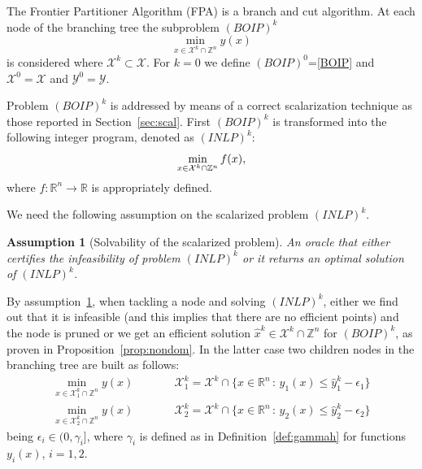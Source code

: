 \documentclass[preprint,12pt]{elsarticle}
\newtheorem{assumption}[theorem]{Assumption}
\def\X{{\cal X}}
\def\R{\mathbb{R}}
\def\Z{\mathbb{Z}}
\begin{document}
The Frontier Partitioner Algorithm (FPA) is a branch and cut algorithm. At each node of the branching tree the subproblem
$(BOIP)^k$
$$\min_{x\in \mathcal{X}^{k}\cap \Z^n} y(x)$$ is considered where $\mathcal{X}^{k}\subset \mathcal{X}$.
For $k=0$ we define $(BOIP)^0$=\eqref{BOIP} and $\mathcal{X}^0=\mathcal{X}$ and $\mathcal{Y}^0=\mathcal{Y}$.


Problem $(BOIP)^k$ is addressed by means of a correct scalarization technique as those reported in Section~\ref{sec:scal}. First
 $(BOIP)^k$ is transformed into the following integer program, denoted as $(INLP)^k$:
\begin{equation}
 \min_{x\in \mathcal{\X}^k\cap \Z^n} f(x),
\end{equation}
where $f:\R^n\rightarrow \R$ is appropriately defined.

We need the following assumption on
the scalarized problem $(INLP)^k$.
\begin{assumption}[Solvability of the scalarized problem]\label{ass:oracle}
An oracle that either certifies the infeasibility of problem  $(INLP)^k$ or it returns an optimal solution of $(INLP)^k$.
\end{assumption}

By assumption~\ref{ass:oracle}, when tackling a node and solving $(INLP)^k$, either we find out that it is infeasible
(and this implies that there are no efficient points) and the node is pruned
or we get an efficient solution $\hat x^k\in \mathcal{X}^k\cap \Z^n$ for $(BOIP)^k$, as proven in Proposition~\ref{prop:nondom}.
In the latter case two children nodes in the branching tree are built as follows:
%
\begin{equation*}\begin{array}{lcl}
 \displaystyle\min_{x\in \mathcal{X}^k_1\cap \Z^n} y(x) & \qquad&\displaystyle\mathcal{X}^k_1 = \mathcal{X}^k \cap \{x\in \R^n\,:\, y_1(x)\leq \hat y^k_1 - \epsilon_1 \}
\\[1.2em]
 \displaystyle\min_{x\in \mathcal{X}^k_2\cap \Z^n} y(x) & \qquad& \displaystyle\mathcal{X}^k_2 = \mathcal{X}^k \cap \{x\in \R^n\,:\, y_2(x)\leq \hat y^k_2 - \epsilon_2 \}
\end{array}
\end{equation*}
being $\epsilon_i\in (0,\gamma_i]$, where $\gamma_i$ is defined as in Definition~\ref{def:gammah} for functions $y_i(x)$, $i=1,2$.
\end{document}
